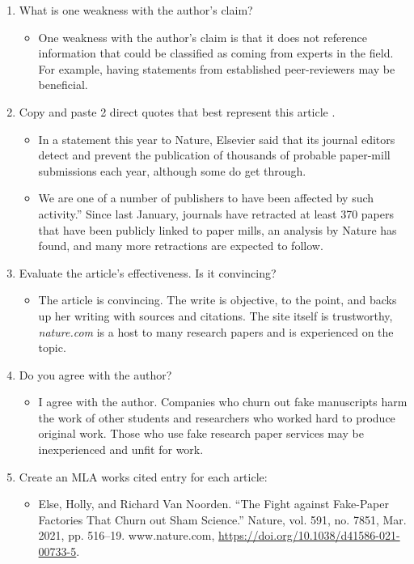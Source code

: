\documentclass{scrartcl}
\begin{document}
\begin{enumerate}
\item What is one weakness with the author's claim?
\begin{itemize}
\item One weakness with the author's claim is that it does not reference
information that could be classified as coming from experts in the field.
For example, having statements from established peer-reviewers may be
beneficial.
\end{itemize}

\item Copy and paste 2 direct quotes that best represent this article .
\begin{itemize}
\item In a statement this year to Nature, Elsevier said that its journal editors
detect and prevent the publication of thousands of probable paper-mill
submissions each year, although some do get through.

\item We are one of a number of publishers to have been affected by such
activity.” Since last January, journals have retracted at least 370
papers that have been publicly linked to paper mills, an analysis by
Nature has found, and many more retractions are expected to follow.
\end{itemize}

\item Evaluate the article's effectiveness. Is it convincing?
\begin{itemize}
\item The article is convincing. The write is objective, to the point, and backs
up her writing with sources and citations. The site itself is trustworthy,
\emph{nature.com} is a host to many research papers and is experienced on the topic.
\end{itemize}

\item Do you agree with the author?
\begin{itemize}
\item I agree with the author.  Companies who churn out fake
manuscripts harm the work of other students and researchers who worked hard
to produce original work. Those who use fake research paper services may be
inexperienced and unfit for work.
\end{itemize}

\item Create an MLA works cited entry for each article:
\begin{itemize}
\item Else, Holly, and Richard Van Noorden. “The Fight against Fake-Paper
Factories That Churn out Sham Science.” Nature, vol. 591, no. 7851, Mar.
2021, pp. 516–19. www.nature.com,
\url{https://doi.org/10.1038/d41586-021-00733-5}.
\end{itemize}
\end{enumerate}
\end{document}
